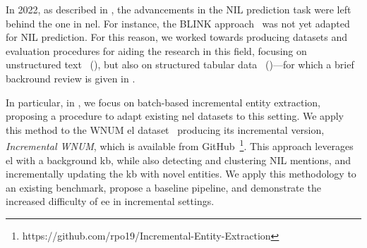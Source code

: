 In 2022, as described in , the advancements in the NIL prediction task were left behind the one in \ac{nel}. For instance, the BLINK approach~\cite{blink} was not yet adapted for NIL prediction.
For this reason, we worked towards producing datasets and evaluation procedures for aiding the research in this field, focusing on unstructured text~\cite{ijckg2022} (), but also on structured tabular data~\cite{mammotab} ()---for which a brief backround review is given in .




In particular, in \textcite{ijckg2022}, we focus on batch-based incremental entity extraction, proposing a procedure to adapt existing \ac{nel} datasets to this setting. We apply this method to the WNUM \ac{el} dataset~\cite{Onoe_Durrett_2020} producing its incremental version, \emph{Incremental WNUM}, which is available from GitHub~\footnote{https://github.com/rpo19/Incremental-Entity-Extraction}. This approach leverages \ac{el} with a background \ac{kb}, while also detecting and clustering NIL mentions, and incrementally updating the \ac{kb} with novel entities. We apply this methodology to an existing benchmark, propose a baseline pipeline, and demonstrate the increased difficulty of \acl{ee} in incremental settings.

